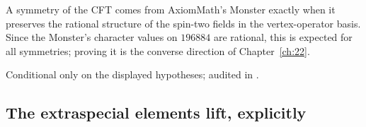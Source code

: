 \begin{physics}
A symmetry of the CFT comes from AxiomMath's Monster exactly when it preserves the rational structure of
the spin-two fields in the vertex-operator basis.  Since the Monster's character values on $196884$ are
rational, this is expected for all symmetries; proving it is the converse direction of Chapter~\ref{ch:22}.
\end{physics}
\begin{status}
Conditional only on the displayed hypotheses; audited in .
\end{status}

\subsection{The extraspecial elements lift, explicitly}

